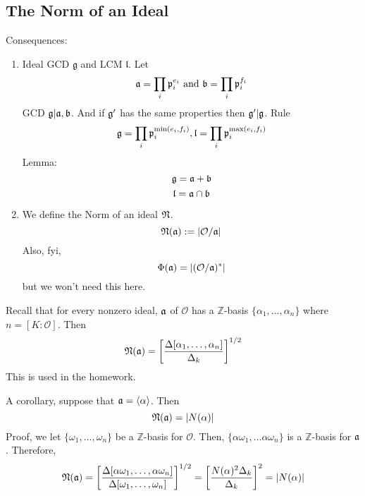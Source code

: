 \documentclass{article}
\begin{document}
\subsection{The Norm of an Ideal}
Consequences: 
\begin{enumerate}
\item Ideal GCD $\mathfrak{g}$ and LCM $\mathfrak{l}$. Let 
\[ \frak{a} = \prod_i \frak{p}_i^{e_i} \text{ and } \frak{b} = \prod_i
\frak{p}_i^{f_i} \]
GCD $\frak{g} | \frak{a},\frak{b}$. And if $\frak{g}'$ has the same properties
then $\frak{g}'|\frak{g}$. Rule
\[ \frak{g} = \prod_i \frak{p}_i^{\text{min}(e_i, f_i)}, \frak{l} = \prod_i
\frak{p}_i^{\text{max}(e_i, f_i)} \]
Lemma: 
\[ \frak{g} = \frak{a} + \frak{b} \]
\[ \frak{l} = \frak{a} \cap \frak{b} \]
\item We define the Norm of an ideal $\frak{N}$. 
\[ \frak{N}(\frak{a}) := |\mathcal{O} / \frak{a}| \]
Also, fyi,
\[ \Phi(\frak{a}) = |(\mathcal{O}/\frak{a})^*| \]
but we won't need this here. 

\end{enumerate}
Recall that for every nonzero ideal, $\frak{a}$ of $\mathcal{O}$ has a
$\mathbb{Z}$-basis $\{\alpha_1, \ldots, \alpha_n\}$ where $n = [K:\mathcal{O}]$.
Then 
\[ \frak{N}(\frak{a}) =
\left[\frac{\Delta[\alpha_1,\ldots,\alpha_n]}{\Delta_k}\right]^{1/2} \]
This is used in the homework.

A corollary, suppose that $\frak{a} = \langle \alpha \rangle$. Then
\[ \frak{N}(\frak{a}) = \left|N(\alpha)\right| \]
Proof, we let $\{\omega_1, \ldots, \omega_n\}$ be a $\mathbb{Z}$-basis for
$\mathcal{O}$. Then, $\{ \alpha \omega_1, \ldots \alpha \omega_n \}$ is a
$\mathbb{Z}$-basis for $\frak{a}$. Therefore, 
\[ \frak{N}(\frak{a}) = \left[ \frac{\Delta[\alpha \omega_1, \ldots, \alpha
\omega_n]}{\Delta[\omega_1, \ldots, \omega_n]} \right]^{1/2} =
\left[\frac{N(\alpha)^2 \Delta_k}{\Delta_k}\right]^2 = |N(\alpha)| \]
\end{document}
